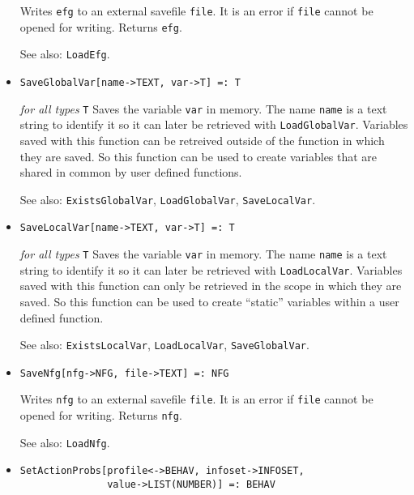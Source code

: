 \begin{itemize}
\bd
Writes \verb+efg+ to an external savefile \verb+file+.  It is an error
if \verb+file+ cannot be opened for writing.  Returns \verb+efg+.
\item [See also:] \verb+LoadEfg+.
\ed

\item{}
\protect \large \begin{verbatim}
SaveGlobalVar[name->TEXT, var->T] =: T
\end{verbatim}\normalsize

{\it for all types} {\tt T}
\bd
Saves the variable \verb+var+ in memory.  The name \verb+name+ is a
text string to identify it so it can later be retrieved with
\verb+LoadGlobalVar+.  Variables saved with this function can be
retreived outside of the function in which they are saved.  So this
function can be used to create variables that are shared in common by
user defined functions.   
\item [See also:] \verb+ExistsGlobalVar+, \verb+LoadGlobalVar+,
\verb+SaveLocalVar+.
\ed

\item{}
\protect \large \begin{verbatim}
SaveLocalVar[name->TEXT, var->T] =: T
\end{verbatim}\normalsize

{\it for all types} {\tt T}
\bd
Saves the variable \verb+var+ in memory.  The name \verb+name+ is a
text string to identify it so it can later be retrieved with
\verb+LoadLocalVar+.  Variables saved with this function can only be
retrieved in the scope in which they are saved.  So this function can
be used to create ``static'' variables within a user defined function.   
\item [See also:] \verb+ExistsLocalVar+, \verb+LoadLocalVar+,
\verb+SaveGlobalVar+.
\ed

\item{}
\protect \large \begin{verbatim}
SaveNfg[nfg->NFG, file->TEXT] =: NFG 
\end{verbatim}\normalsize

\bd
Writes \verb+nfg+ to an external savefile \verb+file+.  It is an
error if \verb+file+ cannot be opened for writing.  Returns \verb+nfg+.
\item [See also:] \verb+LoadNfg+.
\ed


\item{}
\protect \large \begin{verbatim} 
SetActionProbs[profile<->BEHAV, infoset->INFOSET, 
               value->LIST(NUMBER)] =: BEHAV 
\end{verbatim}\normalsize


\end{itemize}
